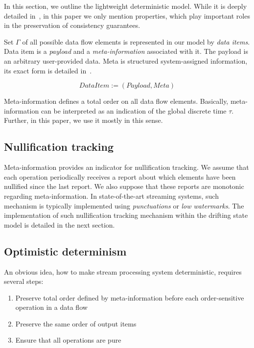 
\label {fs-model-section}

In this section, we outline the lightweight deterministic model. While it is deeply detailed in~\cite{we2018adbis}, in this paper we only mention properties, which play important roles in the preservation of consistency guarantees.

Set $\Gamma$ of all possible data flow elements is represented in our model by {\em data items}. Data item is a {\it payload} and a {\it meta-information} associated with it. The payload is an arbitrary user-provided data. Meta is structured system-assigned information, its exact form is detailed in~\cite{we2018adbis}.

\[DataItem := (Payload, Meta)\]

Meta-information defines a total order on all data flow elements. Basically, meta-information can be interpreted as an indication of the global discrete time $\tau$. Further, in this paper, we use it mostly in this sense.

\subsection{Nullification tracking}

Meta-information provides an indicator for nullification tracking. We assume that each operation periodically receives a report about which elements have been nullified since the last report. We also suppose that these reports are monotonic regarding meta-information. In state-of-the-art streaming systems, such mechanism is typically implemented using {\em punctuations} or {\em low watermarks}. The implementation of such nullification tracking mechanism within the drifting state model is detailed in the next section.

\subsection{Optimistic determinism}

An obvious idea, how to make stream processing system deterministic, requires several steps:
\begin{enumerate}
    \item Preserve total order defined by meta-information before each order-sensitive operation in a data flow
    \item Preserve the same order of output items
    \item Ensure that all operations are pure
\end{enumerate}

